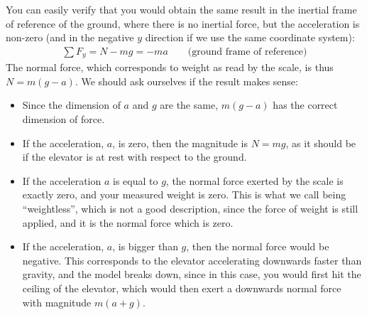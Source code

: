\begin{example}
You can easily verify that you would obtain the same result in the inertial frame of reference of the ground, where there is no inertial force, but the acceleration is non-zero (and in the negative $y$ direction if we use the same coordinate system):
\begin{align*}
\sum F_y =N-mg = -ma \quad\quad\text{(ground frame of reference)}
\end{align*}
The normal force, which corresponds to weight as read by the scale, is thus $N=m(g-a)$. We should ask ourselves if the result makes sense:
\begin{itemize}
\item Since the dimension of $a$ and $g$ are the same, $m(g-a)$ has the correct dimension of force.
\item If the acceleration, $a$, is zero, then the magnitude is $N=mg$, as it should be if the elevator is at rest with respect to the ground.
\item If the acceleration $a$ is equal to $g$, the normal force exerted by the scale is exactly zero, and your measured weight is zero. This is what we call being ``weightless'', which is not a good description, since the force of weight is still applied, and it is the normal force which is zero.
\item If the acceleration, $a$, is bigger than $g$, then the normal force would be negative. This corresponds to the elevator accelerating downwards faster than gravity, and the model breaks down, since in this case, you would first hit the ceiling of the elevator, which would then exert a downwards normal force with magnitude $m(a+g)$.
\end{itemize}

\end{example}

\newpage
